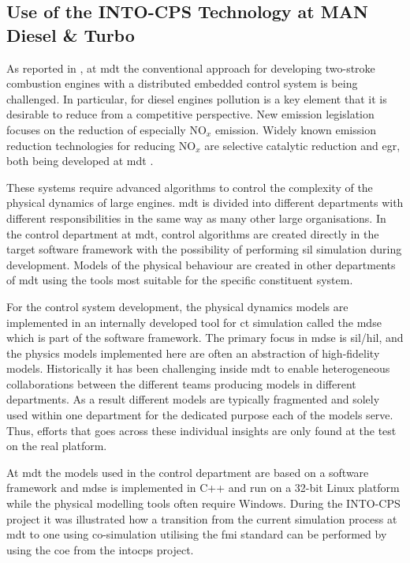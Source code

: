 \subsection{Use of the INTO-CPS Technology at MAN Diesel \& Turbo}

As reported in \cite{Pedersen&17}, at \ac{mdt} the conventional approach for
developing two-stroke combustion engines with a distributed embedded control
system is being challenged. In particular, for diesel engines pollution is a
key element that it is desirable to reduce from a competitive perspective. New
emission legislation focuses on the reduction of especially NO$_x$ emission.
Widely known emission reduction technologies for reducing NO$_x$ are selective
catalytic reduction and \ac{egr}, both being developed at \ac{mdt}
\cite{Pedersen&17}.

These systems require advanced algorithms to control the complexity of the
physical dynamics of large engines. \ac{mdt} is divided into different
departments with different responsibilities in the same way as many other large
organisations. In the control department at \ac{mdt}, control algorithms are
created directly in the target software framework with the possibility of
performing \ac{sil} simulation during development.  Models of the physical
behaviour are created in other departments of \ac{mdt} using the tools most
suitable for the specific constituent system.  

For the control system development, the physical dynamics models are
implemented in an internally developed tool for \ac{ct} simulation called the
\ac{mdse} which is part of the software framework. The primary focus in
\ac{mdse} is \ac{sil}/\ac{hil}, and the physics models implemented here are
often an abstraction of high-fidelity models. Historically it has been
challenging inside \ac{mdt} to enable heterogeneous collaborations between the
different teams producing models in different departments. As a result
different models are typically fragmented and solely used within one department
for the dedicated purpose each of the models serve. Thus, efforts that goes
across these individual insights are only found at the test on the real
platform.


At \ac{mdt} the models used in the control department are based on a software
framework and \ac{mdse} is implemented in C++ and run on a 32-bit Linux
platform while the physical modelling tools often require Windows. During the
INTO-CPS project it was illustrated how a transition from the current
simulation process at \ac{mdt} to one using co-simulation utilising the
\ac{fmi} standard can be performed by using the \ac{coe} from the \ac{intocps}
project. 

